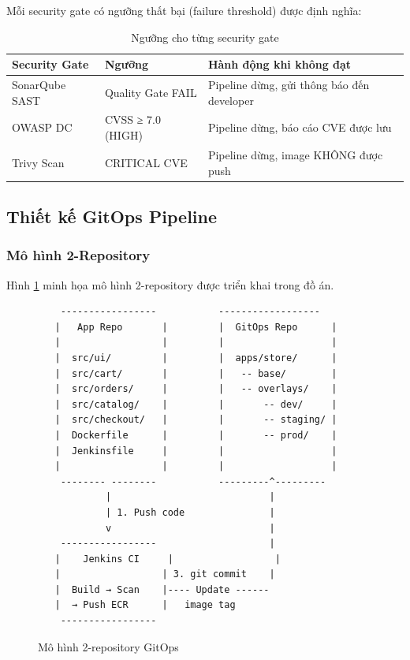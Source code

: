 \documentclass[13pt,a4paper,twoside]{extarticle}
\begin{document}
Mỗi security gate có ngưỡng thất bại (failure threshold) được định nghĩa:

\begin{table}[H]
\centering
\begin{tabular}{@{}p{3.5cm} p{4cm} p{7.5cm}@{}}
\toprule
\textbf{Security Gate} & \textbf{Ngưỡng} & \textbf{Hành động khi không đạt} \\
\midrule
SonarQube SAST & Quality Gate FAIL & Pipeline dừng, gửi thông báo đến developer \\
OWASP DC & CVSS ≥ 7.0 (HIGH) & Pipeline dừng, báo cáo CVE được lưu \\
Trivy Scan & CRITICAL CVE & Pipeline dừng, image KHÔNG được push \\
\bottomrule
\end{tabular}
\caption{Ngưỡng cho từng security gate}
\label{tab:security-gates}
\end{table}

\subsection{Thiết kế GitOps Pipeline}

\subsubsection{Mô hình 2-Repository}

Hình \ref{fig:2repo} minh họa mô hình 2-repository được triển khai trong đồ án.

\begin{figure}[H]
\centering
\begin{verbatim}
    -----------------           ------------------ 
   |   App Repo       |         |  GitOps Repo      |
   |                  |         |                   |
   |  src/ui/         |         |  apps/store/      |
   |  src/cart/       |         |   -- base/        |
   |  src/orders/     |         |   -- overlays/    |
   |  src/catalog/    |         |       -- dev/     |
   |  src/checkout/   |         |       -- staging/ |
   |  Dockerfile      |         |       -- prod/    |
   |  Jenkinsfile     |         |                   |
   |                  |         |                   |
    -------- --------           ---------^--------- 
            |                            |
            | 1. Push code               |
            v                            |
    -----------------                    |
   |    Jenkins CI     |                  |
   |                  | 3. git commit    |
   |  Build → Scan    |---- Update ------ 
   |  → Push ECR      |   image tag
    ----------------- 
\end{verbatim}
\caption{Mô hình 2-repository GitOps}
\label{fig:2repo}
\end{figure}
\end{document}
